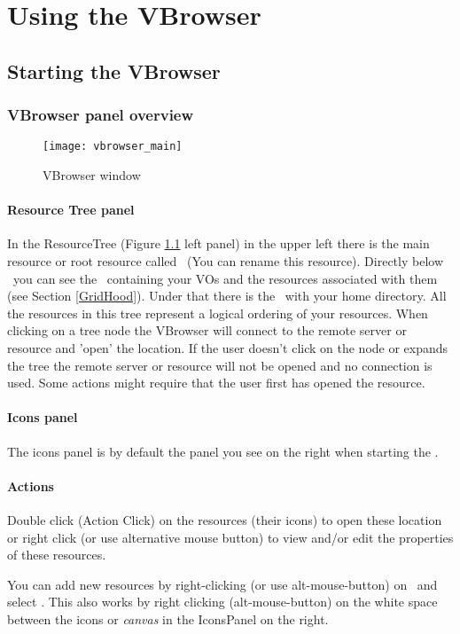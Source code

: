%
%

\chapter{Using the VBrowser}
\label{chap:vbrowser}

\section{Starting the VBrowser} 

\subsection{VBrowser panel overview} 

 \begin{figure}[htbp]
 \centerline{\texttt{[image: vbrowser\_main]}}
 \caption{VBrowser window}
 \label{fig:vbrowser_window}
 \end{figure}
 
 
\subsubsection{Resource Tree panel} 
\label{section:resourcetree_panel}
 In the ResourceTree (Figure \ref{fig:vbrowser_window} left panel) in the upper 
 left there is the main resource or root resource called \myvle\ (You can rename 
 this resource). Directly below \myvle\ you can see the \GridHood\ containing 
 your VOs and the resources associated with them (see Section \ref{GridHood}). 
 Under that there is the \LocalSys\ with your home directory. All the resources in 
 this tree represent a logical ordering of your resources. When clicking on a tree 
 node the VBrowser will connect to the remote server or resource and 'open' the 
 location. If the user doesn't click on the node or expands the tree the remote 
 server or resource will not be opened and no connection is used. Some actions might 
 require that the user first has opened the resource. 
 \\

\subsubsection{Icons panel} 
\label{section:icons_panel}
 The icons panel is by default the panel you see on the right when starting the
 \vbrowser.


\subsubsection{Actions}  
 Double click (Action Click) on the resources (their icons) to open these
 location or right click (or use alternative mouse button) to view and/or edit the properties of
 these resources. 
\par
 You can add new resources by right-clicking (or use alt-mouse-button)  on
 \myvle\ and select . This also works by right clicking
 (alt-mouse-button) on the white space between the icons or \emph{canvas} in
 the IconsPanel on the right. 
\\

